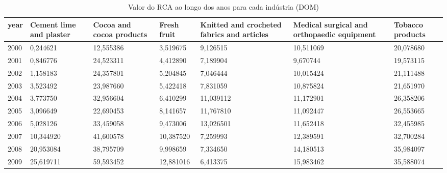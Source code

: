 \begin{table}
\centering
\caption{Valor do RCA ao longo dos anos para cada indústria (DOM)}
\begin{tabular}{p{1cm}p{2cm}p{2cm}p{2cm}p{2cm}p{2cm}p{2cm}}
\toprule
 year &  Cement lime and plaster &  Cocoa and cocoa products &  Fresh fruit &  Knitted and crocheted fabrics and articles &  Medical surgical and orthopaedic equipment &  Tobacco products \\
\midrule
 2000 &                 0,244621 &                 12,555386 &     3,519675 &                                    9,126515 &                                   10,511069 &         20,078680 \\
 2001 &                 0,846776 &                 24,523311 &     4,412890 &                                    7,189904 &                                    9,670744 &         19,573115 \\
 2002 &                 1,158183 &                 24,357801 &     5,204845 &                                    7,046444 &                                   10,015424 &         21,111488 \\
 2003 &                 3,523492 &                 23,987660 &     5,422418 &                                    7,831059 &                                   10,875824 &         21,651970 \\
 2004 &                 3,773750 &                 32,956604 &     6,410299 &                                   11,039112 &                                   11,172901 &         26,358206 \\
 2005 &                 3,096649 &                 22,690453 &     8,141657 &                                   11,767810 &                                   11,092447 &         26,553665 \\
 2006 &                 5,028126 &                 33,459058 &     9,473006 &                                   13,026501 &                                   11,652418 &         32,455985 \\
 2007 &                10,344920 &                 41,600578 &    10,387520 &                                    7,259993 &                                   12,389591 &         32,700284 \\
 2008 &                20,953084 &                 38,795709 &     9,998659 &                                    7,334650 &                                   14,180513 &         35,984097 \\
 2009 &                25,619711 &                 59,593452 &    12,881016 &                                    6,413375 &                                   15,983462 &         35,588074 \\

\end{tabular}
\end{table}
